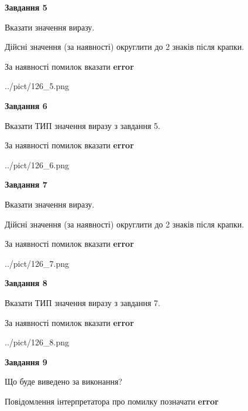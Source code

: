 \documentclass[11pt, ukrainian]{article}
\begin{document}
{\begin {large}
{\begin {center}\textbf{Завдання 5}\end {center}}\par
Вказати значення виразу. \par
Дійсні значення (за наявності) округлити до 2 знаків після крапки. \par
За наявності помилок вказати \textbf{error}

\begin{center}
	{../pict/126_5.png}
\end{center}
\newpage

{\begin {center}\textbf{Завдання 6}\end {center}}\par
Вказати ТИП значення виразу з завдання 5. \par
За наявності помилок вказати \textbf{error}

\begin{center}
	{../pict/126_6.png}
\end{center}
\newpage

{\begin {center}\textbf{Завдання 7}\end {center}}\par
Вказати значення виразу. \par
Дійсні значення (за наявності) округлити до 2 знаків після крапки. \par
За наявності помилок вказати \textbf{error}

\begin{center}
	{../pict/126_7.png}
\end{center}
\newpage

{\begin {center}\textbf{Завдання 8}\end {center}}\par
Вказати ТИП значення виразу з завдання 7. \par
За наявності помилок вказати \textbf{error}

\begin{center}
	{../pict/126_8.png}
\end{center}
\newpage

{\begin {center}\textbf{Завдання 9}\end {center}}\par
Що буде виведено за виконання? \par
Повідомлення інтерпретатора про помилку позначати \textbf{error}


\end{large}}
\end{document}
